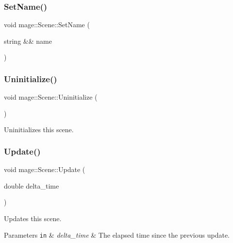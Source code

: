 \hypertarget{classmage_1_1_scene_a86b2e6e764ee134af1706f90603a6596}{}\label{classmage_1_1_scene_a86b2e6e764ee134af1706f90603a6596} 
\subsubsection{\texorpdfstring{Set\+Name()}{SetName()}\hspace{0.1cm}{\footnotesize\ttfamily [2/2]}}
{\footnotesize\ttfamily void mage\+::\+Scene\+::\+Set\+Name (\begin{DoxyParamCaption}\item[{string \&\&}]{name }\end{DoxyParamCaption})\hspace{0.3cm}{\ttfamily [noexcept]}}

\hypertarget{classmage_1_1_scene_a714dc33c04dc2b8e2cec93564905b174}{}\label{classmage_1_1_scene_a714dc33c04dc2b8e2cec93564905b174} 
\subsubsection{\texorpdfstring{Uninitialize()}{Uninitialize()}}
{\footnotesize\ttfamily void mage\+::\+Scene\+::\+Uninitialize (\begin{DoxyParamCaption}{ }\end{DoxyParamCaption})}

Uninitializes this scene. \hypertarget{classmage_1_1_scene_aa10e6eafc00834f63f146589326cbfe2}{}\label{classmage_1_1_scene_aa10e6eafc00834f63f146589326cbfe2} 
\subsubsection{\texorpdfstring{Update()}{Update()}}
{\footnotesize\ttfamily void mage\+::\+Scene\+::\+Update (\begin{DoxyParamCaption}\item[{double}]{delta\+\_\+time }\end{DoxyParamCaption})}

Updates this scene.


\begin{DoxyParams}[1]{Parameters}
\mbox{\tt in}  & {\em delta\+\_\+time} & The elapsed time since the previous update. \\
\hline
\end{DoxyParams}


